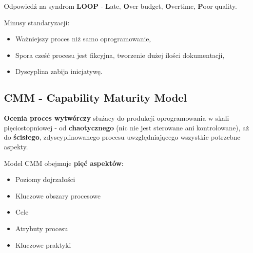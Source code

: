 \documentclass[../main.tex]{subfiles}
\begin{document}
    Odpowiedź na syndrom \textbf{LOOP} - \textbf{L}ate, \textbf{O}ver budget, \textbf{O}vertime, \textbf{P}oor quality.

    Minusy standaryzacji:
    \begin{itemize}
        \item Ważniejszy proces niż samo oprogramowanie,
        \item Spora cześć procesu jest fikcyjna, tworzenie dużej ilości dokumentacji,
        \item Dyscyplina zabija inicjatywę.
    \end{itemize}

    \subsection{CMM - Capability Maturity Model}
    \textbf{Ocenia proces wytwórczy} służacy do produkcji oprogramowania w skali pięciostopniowej - od \textbf{chaotycznego} (nic nie jest
    sterowane ani kontrolowane), aż do \textbf{ścisłego}, zdyscyplinowanego procesu uwzględniającego wszystkie potrzebne aspekty.

    Model CMM obejmuje \textbf{pięć aspektów}:
    \begin{itemize}
        \item Poziomy dojrzałości
        \item Kluczowe obszary procesowe
        \item Cele
        \item Atrybuty procesu
        \item Kluczowe praktyki
    \end{itemize}
\end{document}
